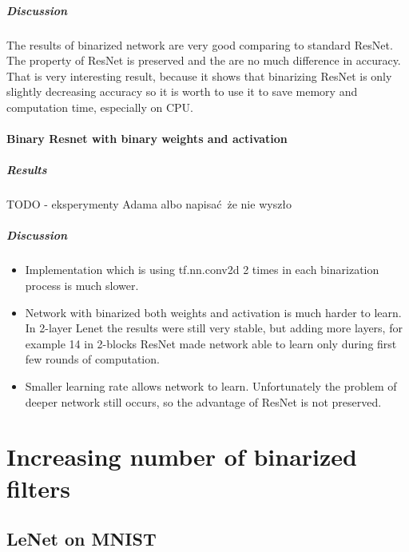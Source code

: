 \documentclass[licencjacka]{pracamgr}
\begin{document}
		        \paragraph{Discussion} 

		        The results of binarized network are very good comparing to standard ResNet. The property of ResNet is preserved and the are no much difference in accuracy. That is very interesting result, because it shows that binarizing ResNet is only slightly decreasing accuracy so it is worth to use it to save memory and computation time, especially on CPU.

			\subsubsection{Binary Resnet with binary weights and activation}
			        \paragraph{Results} 
			        TODO - eksperymenty Adama albo napisać że nie wyszło
			        \paragraph{Discussion} 
			        
			        \begin{itemize}
			                \item Implementation which is using tf.nn.conv2d 2 times in each binarization process is much slower. 
			                \item Network with binarized both weights and activation is much harder to learn. In 2-layer Lenet the results were still very stable, but adding more layers, for example 14 in 2-blocks ResNet made network able to learn only during first few rounds of computation.
			                \item Smaller learning rate allows network to learn. Unfortunately the problem of deeper network still occurs, so the advantage of ResNet is not preserved.
			        \end{itemize}
\chapter{Increasing number of binarized filters}
	\section{LeNet on MNIST}
\end{document}
